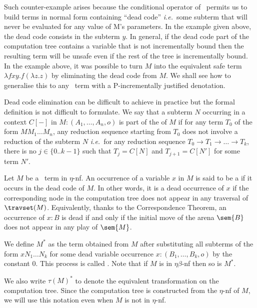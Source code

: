 Such counter-example arises because the conditional operator of \pcf\ permits us to build terms in normal form containing ``dead code'' {\it i.e.}~some subterm that will never be evaluated for any value of M's parameters. In the example given above, the dead code consists in the subterm $y$. In general, if the dead code part of the computation tree contains a variable that is not incrementally bound then the resulting term will be unsafe even if the rest of the tree is incrementally bound.
In the example above, it was possible to turn $M$ into the equivalent safe term $\lambda f x y. f (\lambda z. z)$ by eliminating the dead code from $M$.
We shall see how to generalise this to any \pcf\ term with a P-incrementally justified denotation.

Dead code elimination can be difficult to achieve in practice but the formal definition is not difficult to formulate. We say that a subterm $N$ occurring
in a context $C[-]$ in $M : (A_1, \ldots, A_n,o)$ is part of the  of $M$ if for any term $T_0$ of the form $M M_1 \ldots M_n$,
any reduction sequence starting from $T_0$ does not involve a reduction of the subterm $N$ {\it i.e.}~for any reduction sequence $T_0 \rightarrow T_1 \rightarrow \ldots \rightarrow T_k$, there is no $j\in \{0.. k-1\}$ such that $T_j = C[N]$ and $T_{j+1} = C[N']$ for some term $N'$.


Let $M$  be a \pcf\ term in $\eta$-nf.
An occurrence of a variable $x$ in $M$ is said to be a 
if it occurs in the dead code of $M$. In other words, it is a
dead occurrence of $x$ if the corresponding node in the computation tree does not appear in any traversal of $\travset(M)$. Equivalently, thanks to the Correspondence Theorem, an occurrence of $x:B$ is dead if and only if the initial move
of the arena $\sem{B}$ does not appear in any play of $\sem{M}$.


We define $M^*$ as the term obtained from $M$ after substituting all subterms of the form  $x N_1 \dots N_k$ for some dead variable occurrence $x:(B_1,\ldots, B_k, o)$ by the constant $0$. This process is called .
Note that if $M$ is in $\eta\beta$-nf then so is $M^*$.

We also write $\tau(M)^*$ to denote the equivalent transformation on the computation tree. Since the computation tree is constructed from the $\eta$-nf of $M$, we will use this notation even when $M$ is not in $\eta$-nf.



